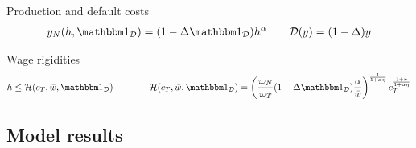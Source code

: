 Production and default costs
\begin{align}
	y_N(h, \ind_\mathcal{D}) = (1 - \Delta \ind_\mathcal{D}) h^\alpha \qquad \mathcal{D}(y) = (1-\Delta) y
\end{align}

Wage rigidities
\begin{align}
	h \leq \mathcal{H}(c_T, \bar{w}, \ind_\mathcal{D}) \qquad\qquad \mathcal{H}(c_T, \bar{w}, \ind_\mathcal{D}) = \left(\frac{\varpi_N}{\varpi_T} (1 - \Delta \ind_\mathcal{D}) \frac{\alpha}{\bar{w}}\right)^\frac{1}{1+\alpha\eta} c_T^\frac{1+\eta}{1+\alpha\eta}
\end{align}


\subsection{Model results}

